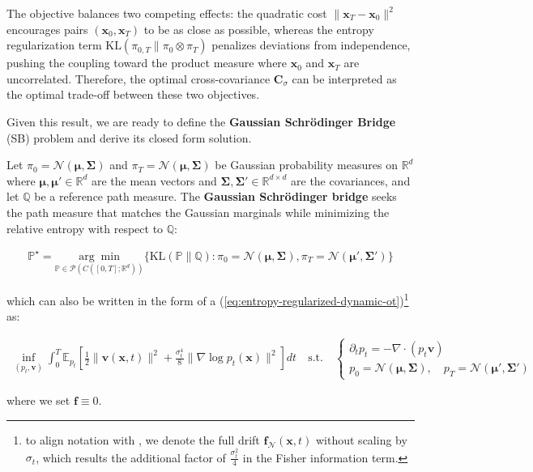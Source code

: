 \documentclass{article}
\newcommand{\boldtext}[1]{\textbf{\textcolor{MyGreen}{#1}}}
\begin{document}
The objective balances two competing effects: the quadratic cost $\|\boldsymbol{x}_T - \boldsymbol{x}_0\|^2$ encourages pairs $(\boldsymbol{x}_0,\boldsymbol{x}_T)$ to be as close as possible, whereas the entropy regularization term $\text{KL}\left(\pi_{0,T} \| \pi_0 \otimes \pi_T\right)$ penalizes deviations from independence, pushing the coupling toward the product measure where $\boldsymbol{x}_0$ and $\boldsymbol{x}_T$ are uncorrelated. Therefore, the optimal cross-covariance $\boldsymbol{C}_\sigma$ can be interpreted as the optimal trade-off between these two objectives.

Given this result, we are ready to define the \boldtext{Gaussian Schrödinger Bridge} (SB) problem and derive its closed form solution.

\begin{definition}\label{def:gaussian-sbp}
Let $\pi_0 =\mathcal{N}(\boldsymbol{\mu}, \boldsymbol{\Sigma})$ and $\pi_T = \mathcal{N}(\boldsymbol{\mu}, \boldsymbol{\Sigma})$ be Gaussian probability measures on $\mathbb{R}^d$ where $\boldsymbol{\mu}, \boldsymbol{\mu}'\in \mathbb{R}^d$ are the mean vectors and $\boldsymbol{\Sigma}, \boldsymbol{\Sigma}'\in \mathbb{R}^{d\times d}$ are the covariances, and let $\mathbb{Q}$ be a reference path measure. The \textbf{Gaussian Schrödinger bridge} seeks the path measure that matches the Gaussian marginals while minimizing the relative entropy with respect to $\mathbb{Q}$:
\begin{small}
\begin{align}
    \mathbb{P}^\star=\underset{\mathbb{P}\in \mathcal{P}(C([0,T]; \mathbb{R}^d))}{\arg\min}\big\{\text{KL}(\mathbb{P}\|\mathbb{Q}):\pi_0 =\mathcal{N}(\boldsymbol{\mu}, \boldsymbol{\Sigma}),\pi_T=\mathcal{N}(\boldsymbol{\mu}', \boldsymbol{\Sigma}')\big\}\tag{Gaussian SB Problem}\label{eq:gaussian-sb-problem}
\end{align}
\end{small}
which can also be written in the form of a (\ref{eq:entropy-regularized-dynamic-ot})\footnote{to align notation with \citep{bunne2023schrodinger}, we denote the full drift $\boldsymbol{f}_\mathcal{N}(\boldsymbol{x},t)$ without scaling by $\sigma_t$, which results the additional factor of $\frac{\sigma_t^2}{4}$ in the Fisher information term.} as:
\begin{small}
\begin{align}
    \inf_{(p_t, \boldsymbol{v})}\int_0^T\mathbb{E}_{p_t}\left[\frac{1}{2}\|\boldsymbol{v}(\boldsymbol{x},t)\|^2+\frac{\sigma^4_t}{8}\|\nabla\log p_t(\boldsymbol{x})\|^2\right]dt\quad \text{s.t.}\quad \begin{cases}
        \partial_tp_t=-\nabla \cdot(p_t\boldsymbol{v})\\
        p_0=\mathcal{N}(\boldsymbol{\mu},\boldsymbol{\Sigma}), \quad p_T=\mathcal{N}(\boldsymbol{\mu}',\boldsymbol{\Sigma}')
    \end{cases}
\end{align}
\end{small}
where we set $\boldsymbol{f}\equiv 0$.
\end{definition}
\end{document}
